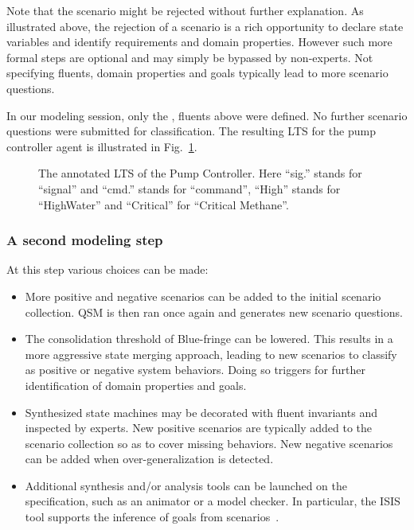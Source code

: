 Note that the scenario might be rejected without further explanation. As illustrated above, the rejection of a scenario is a rich opportunity to declare state variables and identify requirements and domain properties. However such more formal steps are optional and may simply be bypassed by non-experts. Not specifying fluents, domain properties and goals typically lead to more scenario questions.

In our modeling session, only the ,  fluents above were defined. No further scenario questions were submitted for classification. The resulting LTS for the pump controller agent is illustrated in Fig.~\ref{image:minepump-controller-1-annotated}.

\begin{figure}
\centering
{}
\caption[The annotated LTS of the Pump Controller]{The annotated LTS of the Pump Controller\label{image:minepump-controller-1-annotated}. Here ``sig.'' stands for ``signal'' and ``cmd.'' stands for ``command'', ``High'' stands for ``HighWater'' and ``Critical'' for ``Critical Methane''.}
\end{figure}

\subsubsection*{A second modeling step}

At this step various choices can be made:
\begin{itemize}
\item More positive and negative scenarios can be added to the initial scenario collection. QSM is then ran once again and generates new scenario questions.
\item The consolidation threshold of Blue-fringe can be lowered. This results in a more aggressive state merging approach, leading to new scenarios to classify as positive or negative system behaviors. Doing so triggers for further identification of domain properties and goals.
\item Synthesized state machines may be decorated with fluent invariants and inspected by experts. New positive scenarios are typically added to the scenario collection so as to cover missing behaviors. New negative scenarios can be added when over-generalization is detected.
\item Additional synthesis and/or analysis tools can be launched on the specification, such as an animator or a model checker. In particular, the ISIS tool supports the inference of goals from scenarios~\cite{Damas:2006, Damas:2011}.
\end{itemize}

